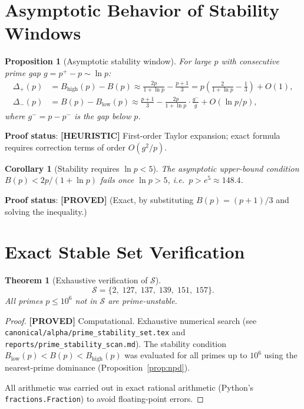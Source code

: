 \documentclass[11pt,a4paper]{article}
\newtheorem{theorem}{Theorem}
\newtheorem{proposition}{Proposition}
\newtheorem{corollary}{Corollary}
\newcommand{\proved}[1]{\textbf{[PROVED]} #1}
\newcommand{\heuristic}[1]{\textbf{[HEURISTIC]} #1}
\begin{document}
\section{Asymptotic Behavior of Stability Windows}

\begin{proposition}[Asymptotic stability window]
  For large $p$ with consecutive prime gap $g = p^+ - p \sim \ln p$:
  \begin{align*}
    \Delta_+(p) &= B_\mathrm{high}(p) - B(p)
    \approx \frac{2p}{1+\ln p} - \frac{p+1}{3}
    = p\!\left(\frac{2}{1+\ln p} - \frac{1}{3}\right) + O(1), \\
    \Delta_-(p) &= B(p) - B_\mathrm{low}(p)
    \approx \frac{p+1}{3} - \frac{2p}{1+\ln p} \cdot \frac{g^-}{g}
    + O(\ln p / p),
  \end{align*}
  where $g^- = p - p^-$ is the gap below $p$.
\end{proposition}

\textbf{Proof status}: \heuristic{First-order Taylor expansion; exact formula
requires correction terms of order $O(g^2/p)$.}

\begin{corollary}[Stability requires $\ln p < 5$]
  The asymptotic upper-bound condition $B(p) < 2p/(1+\ln p)$ fails once
  $\ln p > 5$, i.e.\ $p > e^5 \approx 148.4$.
\end{corollary}

\textbf{Proof status}: \proved{} (Exact, by substituting $B(p) = (p+1)/3$ and
solving the inequality.)

\section{Exact Stable Set Verification}

\begin{theorem}[Exhaustive verification of $\mathcal{S}$]
  \label{thm:S}
  \[
    \mathcal{S} = \{2,\; 127,\; 137,\; 139,\; 151,\; 157\}.
  \]
  All primes $p \leq 10^6$ not in $\mathcal{S}$ are prime-unstable.
\end{theorem}

\begin{proof}
  \proved{Computational.}  Exhaustive numerical search (see
  \texttt{canonical/alpha/prime\_stability\_set.tex} and
  \texttt{reports/prime\_stability\_scan.md}).  The stability condition
  $B_\mathrm{low}(p) < B(p) < B_\mathrm{high}(p)$ was evaluated for all
  primes up to $10^6$ using the nearest-prime dominance
  (Proposition~\ref{prop:npd}).

  All arithmetic was carried out in exact rational arithmetic (Python's
  \texttt{fractions.Fraction}) to avoid floating-point errors.
\end{proof}
\end{document}
